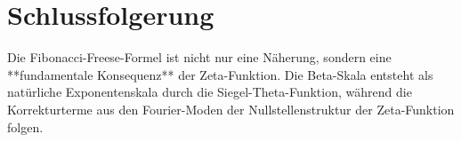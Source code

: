 \documentclass{article}
\begin{document}
\section{Schlussfolgerung}
Die Fibonacci-Freese-Formel ist nicht nur eine Näherung, sondern eine **fundamentale Konsequenz** der Zeta-Funktion.  
Die Beta-Skala entsteht als natürliche Exponentenskala durch die Siegel-Theta-Funktion, während die Korrekturterme aus den Fourier-Moden der Nullstellenstruktur der Zeta-Funktion folgen.
\end{document}
